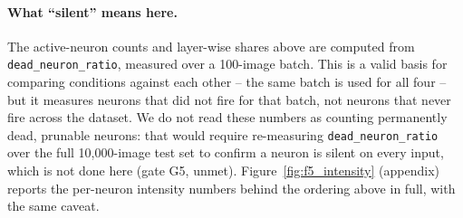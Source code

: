 \paragraph{What ``silent'' means here.}
The active-neuron counts and layer-wise shares above are computed from
\texttt{dead\_neuron\_ratio}, measured over a 100-image batch. This is a
valid basis for comparing conditions against each other -- the same batch
is used for all four -- but it measures neurons that did not fire for
that batch, not neurons that never fire across the dataset. We do not read
these numbers as counting permanently dead, prunable neurons: that would
require re-measuring \texttt{dead\_neuron\_ratio} over the full 10,000-image
test set to confirm a neuron is silent on every input, which is not done
here (gate G5, unmet). Figure~\ref{fig:f5_intensity} (appendix) reports
the per-neuron intensity numbers behind the ordering above in full, with
the same caveat.

